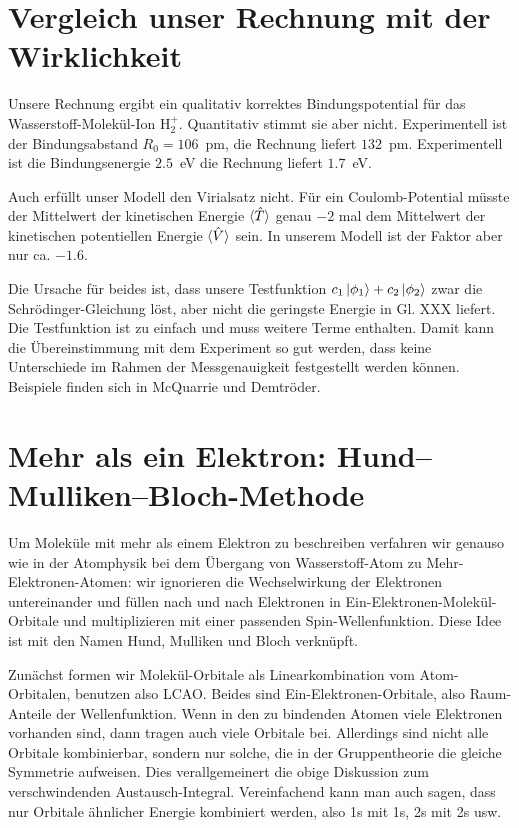 \section{Vergleich unser Rechnung mit der Wirklichkeit}

Unsere Rechnung ergibt ein qualitativ korrektes Bindungspotential für das  Wasserstoff-Molekül-Ion H$_2^+$. Quantitativ stimmt sie aber nicht. Experimentell ist der Bindungsabstand $R_0 = 106$~pm, die Rechnung liefert $132$~pm. Experimentell ist die Bindungsenergie $2.5$~eV die Rechnung liefert $1.7$~eV.

Auch erfüllt unser Modell den Virialsatz nicht. Für ein Coulomb-Potential müsste der Mittelwert der kinetischen Energie $\braket{\hat{T}}$ genau $-2$ mal dem Mittelwert der kinetischen potentiellen Energie $\braket{\hat{V}}$ sein. In unserem Modell ist der Faktor aber nur ca. $-1.6$.

Die Ursache für beides ist, dass unsere Testfunktion $c_1 \ket{\phi_1} + c_2 \ket{\phi_2}$ zwar die Schrödinger-Gleichung löst, aber nicht die geringste Energie in Gl. XXX liefert. Die Testfunktion ist zu einfach und muss weitere Terme enthalten. Damit kann die Übereinstimmung mit dem Experiment so gut werden, dass keine Unterschiede im Rahmen der Messgenauigkeit festgestellt werden können. Beispiele finden sich in McQuarrie und Demtröder.


\section{Mehr als ein Elektron: Hund--Mulliken--Bloch-Methode }

Um Moleküle mit mehr als einem Elektron zu beschreiben verfahren wir genauso wie in der Atomphysik bei dem Übergang von Wasserstoff-Atom zu Mehr-Elektronen-Atomen: wir ignorieren die Wechselwirkung der Elektronen untereinander und füllen nach und nach Elektronen in Ein-Elektronen-Molekül-Orbitale und multiplizieren mit einer passenden Spin-Wellenfunktion. Diese Idee ist mit den Namen Hund, Mulliken und Bloch verknüpft.

Zunächst formen wir Molekül-Orbitale als Linearkombination vom Atom-Orbitalen, benutzen also LCAO. Beides sind Ein-Elektronen-Orbitale, also Raum-Anteile der Wellenfunktion. Wenn in den zu bindenden Atomen viele Elektronen vorhanden sind, dann tragen auch viele Orbitale bei.  Allerdings sind nicht alle Orbitale kombinierbar, sondern nur solche, die in der Gruppentheorie die gleiche Symmetrie aufweisen. Dies verallgemeinert die obige Diskussion zum verschwindenden Austausch-Integral. Vereinfachend kann man auch sagen, dass nur Orbitale ähnlicher Energie kombiniert werden, also 1s mit 1s, 2s mit 2s usw. 

